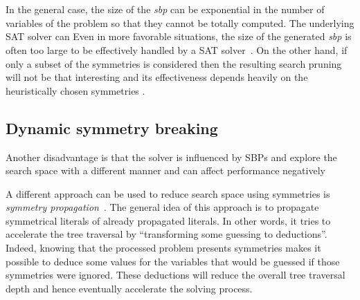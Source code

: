 \\
\\
\\
\\

\\

\\
\\



In the general case,
the size of the \textit{sbp} can be exponential in the number of variables of
the problem so that they cannot be totally computed. The underlying SAT solver can 
 Even in more favorable
situations, the size of the generated \textit{sbp} is often too large to be
effectively handled by a SAT solver~\cite{Luks2004}. On the other hand, if
only a subset of the symmetries is considered then the resulting search pruning
will not be that interesting and its effectiveness depends heavily on the
heuristically chosen symmetries \cite{biere2009handbook}.




\subsection{Dynamic symmetry breaking}


Another disadvantage is that the solver is influenced by SBPs and explore the search space with a different 
manner and can affect performance negatively 

A different approach can be used to reduce search space using symmetries is \emph{symmetry propagation}~\cite{Devriendt12}.
The general idea of this approach is to propagate symmetrical literals of already propagated literals.
In other words, it tries to accelerate the tree traversal by ``transforming some guessing to deductions''.
Indeed, knowing that the processed problem presents symmetries makes it possible to deduce some values 
for the variables that would be guessed if those symmetries were ignored.
These deductions will reduce the overall tree traversal depth and hence eventually accelerate the solving process.


